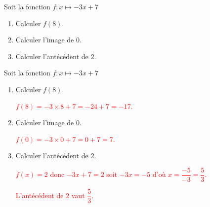 \begin{exercice*}
    Soit la fonction $f:x\longmapsto -3x+7$
    \begin{enumerate}
        \item Calculer $f(8)$.
        \item Calculer l'image de $0$.
        \item Calculer l'antécédent de $2$.
    \end{enumerate}
\end{exercice*}
\begin{corrige}
    Soit la fonction $f:x\longmapsto -3x+7$
    
    \begin{enumerate}
        \item Calculer $f(8)$.
        
        \textcolor{red}{$f(8)=-3\times 8 + 7=-24+7=-17$.}
        \item Calculer l'image de $0$.
        
        \textcolor{red}{$f(0)=-3\times 0 + 7=0+7=7$.}
        \item Calculer l'antécédent de $2$.
        
        \textcolor{red}{$f(x)=2$ donc $-3x + 7=2$ soit $-3x=-5$ d'où $x=\dfrac{-5}{-3}=\dfrac53$.}

        \textcolor{red}{L'antécédent de $2$ vaut $\dfrac53$.}
    \end{enumerate}
\end{corrige}
